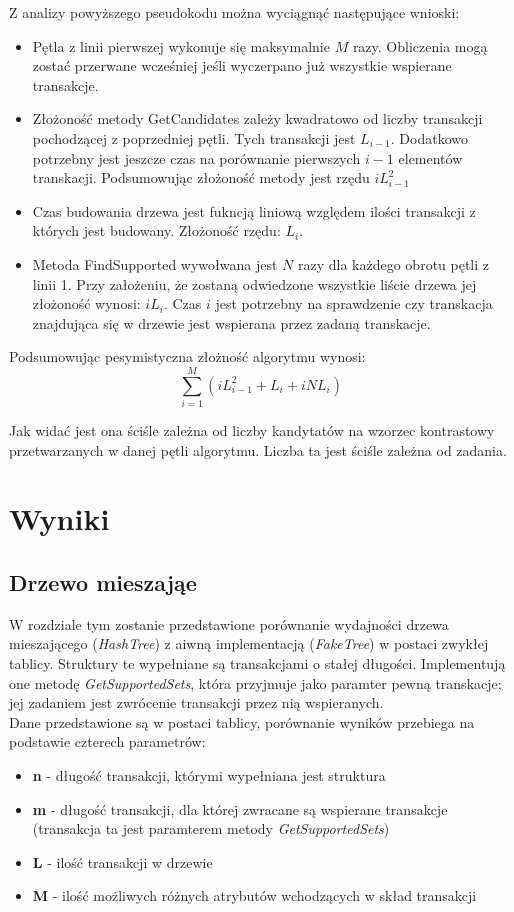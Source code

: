 \documentclass[a4paper,12pt]{article}
\begin{document}
Z analizy powyższego pseudokodu można wyciągnąć następujące wnioski:
\begin{itemize}
\item Pętla z linii pierwszej wykonuje się maksymalnie $M$ razy. Obliczenia mogą zostać przerwane wcześniej jeśli wyczerpano już wszystkie wspierane transakcje.
\item Złożoność metody GetCandidates zależy kwadratowo od liczby transakcji pochodzącej z poprzedniej pętli. Tych transakcji jest $L_{i-1}$. Dodatkowo potrzebny jest jeszcze czas na porównanie pierwszych $i-1$ elementów transkacji. Podsumowując złożoność metody jest rzędu $iL_{i-1}^2$
\item Czas budowania drzewa jest fukncją liniową względem ilości transakcji z których jest budowany. Złożoność rzędu: $L_i$.
\item Metoda FindSupported wywołwana jest $N$ razy dla każdego obrotu pętli z linii 1.  Przy założeniu, że zostaną odwiedzone wszystkie liście drzewa jej złożoność wynosi: $iL_i$. Czas $i$ jest potrzebny na sprawdzenie czy transkacja znajdująca się w drzewie jest wspierana przez zadaną transkacje.
\end{itemize}

Podsumowując pesymistyczna złożność algorytmu wynosi:
$$ \sum_{i=1}^M (iL_{i-1}^2 + L_i + iNL_i) $$

Jak widać jest ona ściśle zależna od liczby kandytatów na wzorzec kontrastowy przetwarzanych w danej pętli algorytmu. Liczba ta jest ściśle zależna od zadania.


\section{Wyniki}



\subsection{Drzewo mieszająe}

W rozdziale tym zostanie przedstawione porównanie wydajności drzewa mieszającego (\textit{HashTree}) z aiwną implementacją (\textit{FakeTree}) w postaci zwykłej tablicy. Struktury te wypełniane są transakcjami o stałej długości. Implementują one metodę \textit{GetSupportedSets}, która przyjmuje jako paramter pewną transkacje; jej zadaniem jest zwrócenie transakcji przez nią wspieranych. \\
Dane przedstawione są w postaci tablicy, porównanie wyników przebiega na podstawie czterech parametrów:
\begin{itemize}
\item {\bf n} - długość transakcji, którymi wypełniana jest struktura
\item {\bf m} - długość transakcji, dla której zwracane są wspierane transakcje (transakcja ta jest paramterem metody \textit{GetSupportedSets})
\item {\bf L} - ilość transakcji w drzewie
\item {\bf M} - ilość możliwych różnych atrybutów wchodzących w skład transakcji
\end{itemize}
\end{document}
